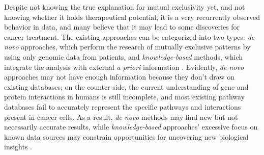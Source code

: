 Despite not knowing the true explanation for mutual exclusivity yet, and not knowing whether it holds therapeutical potential, it is a very recurrently observed behavior in data, and many believe that it may lead to some discoveries for cancer treatment. The existing approaches can be categorized into two types: \textit{de novo} approaches, which perform the research of mutually exclusive patterns by using only genomic data from patients, and \textit{knowledge-based} methods, which integrate the analysis with external \textit{a priori} information \cite{survey}. Evidently, \textit{de novo} approaches may not have enough information because they don't draw on existing databases; on the counter side, the current understanding of gene and protein interactions in humans is still incomplete, and most existing pathway databases fail to accurately represent the specific pathways and interactions present in cancer cells. As a result, \textit{de novo} methods may find new but not necessarily accurate results, while \textit{knowledge-based} approaches' excessive focus on known data sources may constrain opportunities for uncovering new biological insights \cite{multi-dendrix}.

\cleardoublepage
